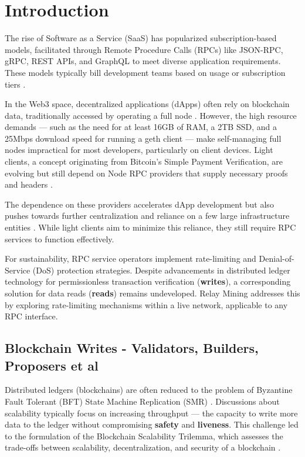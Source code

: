 \documentclass[runningheads]{llncs}
\begin{document}
\section{Introduction}

The rise of Software as a Service (SaaS) has popularized subscription-based models, facilitated through Remote Procedure Calls (RPCs) like JSON-RPC, gRPC, REST APIs, and GraphQL to meet diverse application requirements. These models typically bill development teams based on usage or subscription tiers \cite{salesforceWhatSaaS}. 

In the Web3 space, decentralized applications (dApps) often rely on blockchain data, traditionally accessed by operating a full node \cite{alchemyProsCons}. However, the high resource demands — such as the need for at least 16GB of RAM, a 2TB SSD, and a 25Mbps download speed for running a geth client \cite{ethereumHardwareRequirements} — make self-managing full nodes impractical for most developers, particularly on client devices. Light clients, a concept originating from Bitcoin's Simple Payment Verification, are evolving but still depend on Node RPC providers that supply necessary proofs and headers \cite{nakamoto2008bitcoin}.

The dependence on these providers accelerates dApp development but also pushes towards further centralization and reliance on a few large infrastructure entities \cite{moxie2022}. While light clients aim to minimize this reliance, they still require RPC services to function effectively.

For sustainability, RPC service operators implement rate-limiting and Denial-of-Service (DoS) protection strategies. Despite advancements in distributed ledger technology for permissionless transaction verification (\textbf{writes}), a corresponding solution for data reads (\textbf{reads}) remains undeveloped. Relay Mining addresses this by exploring rate-limiting mechanisms within a live network, applicable to any RPC interface.

\subsection{Blockchain Writes - Validators, Builders, Proposers et al}

Distributed ledgers (blockchains) are often reduced to the problem of Byzantine Fault Tolerant (BFT) State Machine Replication (SMR) \cite{buchman2019latest}. Discussions about scalability typically focus on increasing throughput — the capacity to write more data to the ledger without compromising \textbf{safety} and \textbf{liveness}. This challenge led to the formulation of the Blockchain Scalability Trilemma, which assesses the trade-offs between scalability, decentralization, and security of a blockchain \cite{Halpin_2020}.
\end{document}
